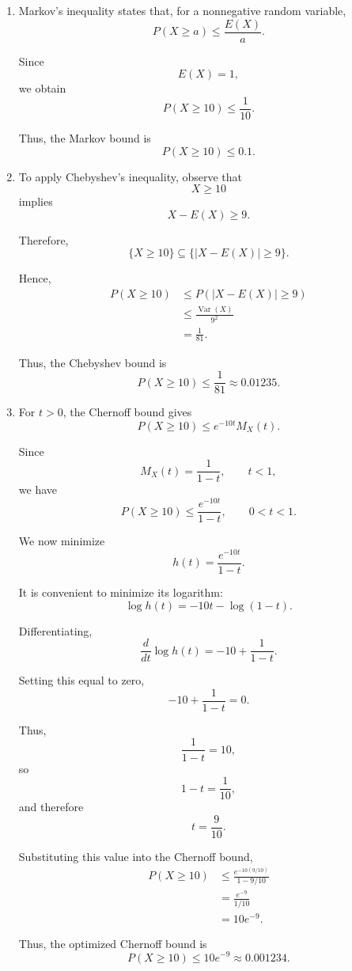 \documentclass[11pt]{article}
\newenvironment{solution}{
    \par
    \begin{tcolorbox}[
        colback=white,
        colframe=uwgold,
        boxrule=0.7pt,
        arc=2mm,
        left=3mm,
        right=3mm,
        top=2mm,
        bottom=2mm,
        breakable,
        before skip=0.5em,
        after skip=1em,
        title=\textbf{Solution},
        coltitle=uwpurple,
        fonttitle=\bfseries
    ]
}{
    \end{tcolorbox}
}
\begin{document}
\begin{solution}

\begin{enumerate}[label=(\alph*)]

\item Markov's inequality states that, for a nonnegative random variable,
\[
P(X\geq a)
\leq
\frac{E(X)}{a}.
\]

Since
\[
E(X)=1,
\]
we obtain
\[
P(X\geq10)
\leq
\frac{1}{10}.
\]

Thus, the Markov bound is
\[
P(X\geq10)\leq 0.1.
\]


\item To apply Chebyshev's inequality, observe that
\[
X\geq10
\]
implies
\[
X-E(X)\geq9.
\]

Therefore,
\[
\{X\geq10\}
\subseteq
\{|X-E(X)|\geq9\}.
\]

Hence,
\[
\begin{aligned}
P(X\geq10)
&\leq
P(|X-E(X)|\geq9)\\
&\leq
\frac{\operatorname{Var}(X)}{9^2}\\
&=
\frac{1}{81}.
\end{aligned}
\]

Thus, the Chebyshev bound is
\[
P(X\geq10)
\leq
\frac{1}{81}
\approx
0.01235.
\]


\item For \(t>0\), the Chernoff bound gives
\[
P(X\geq10)
\leq
e^{-10t}M_X(t).
\]

Since
\[
M_X(t)=\frac{1}{1-t},
\qquad t<1,
\]
we have
\[
P(X\geq10)
\leq
\frac{e^{-10t}}{1-t},
\qquad 0<t<1.
\]

We now minimize
\[
h(t)=\frac{e^{-10t}}{1-t}.
\]

It is convenient to minimize its logarithm:
\[
\log h(t)
=
-10t-\log(1-t).
\]

Differentiating,
\[
\frac{d}{dt}\log h(t)
=
-10+\frac{1}{1-t}.
\]

Setting this equal to zero,
\[
-10+\frac{1}{1-t}=0.
\]

Thus,
\[
\frac{1}{1-t}=10,
\]
so
\[
1-t=\frac{1}{10},
\]
and therefore
\[
t=\frac{9}{10}.
\]

Substituting this value into the Chernoff bound,
\[
\begin{aligned}
P(X\geq10)
&\leq
\frac{e^{-10(9/10)}}{1-9/10}\\
&=
\frac{e^{-9}}{1/10}\\
&=
10e^{-9}.
\end{aligned}
\]

Thus, the optimized Chernoff bound is
\[
P(X\geq10)
\leq
10e^{-9}
\approx
0.001234.
\]



\end{enumerate}
\end{solution}
\end{document}
